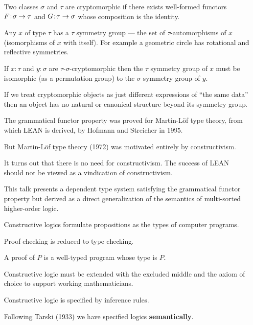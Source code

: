 {\vfill
Two classes $\sigma$ and $\tau$ are cryptomorphic if there exists well-formed functors $F\!:\!\sigma \rightarrow \tau$
and $G\!:\!\tau \rightarrow \sigma$ whose composition is the identity.


Any $x$ of type $\tau$ has a $\tau$ symmetry group --- the set of $\tau$-automorphisms of $x$ (isomorphisms of $x$ with itself).  For example a geometric
circle has rotational and reflective symmetries.

\vfill
If $x\!:\!\tau$ and $y\!:\!\sigma$ are $\tau$-$\sigma$-cryptomorphic then the $\tau$ symmetry group of $x$ must be isomorphic (as a permutation group) to the $\sigma$ symmetry group of $y$.

\vfill
If we treat cryptomorphic objects as just different expressions of ``the same data'' then an object has no natural or canonical structure beyond its symmetry group.



The grammatical functor property was proved for Martin-L\"{o}f type theory, from which LEAN is derived, by Hofmann and Streicher in 1995.

\vfill
But Martin-L\"{o}f type theory (1972) was motivated entirely by constructivism.


\vfill
It turns out that there is no need for constructivism.  The success of LEAN should not be viewed as a vindication of constructivism.

\vfill
This talk presents a dependent type system satisfying the grammatical functor property but derived as a direct generalization of the semantics of multi-sorted higher-order logic.


Constructive logics formulate propositions as the types of computer programs.

\vfill
Proof checking is reduced to type checking.

\vfill
A proof of $P$ is a well-typed program whose type is $P$.

\vfill
Constructive logic must be extended with the excluded middle and the axiom of choice to support working mathematicians.


Constructive logic is specified by inference rules.

\vfill
Following Tarski (1933) we have specified logics {\bf semantically}.

}
